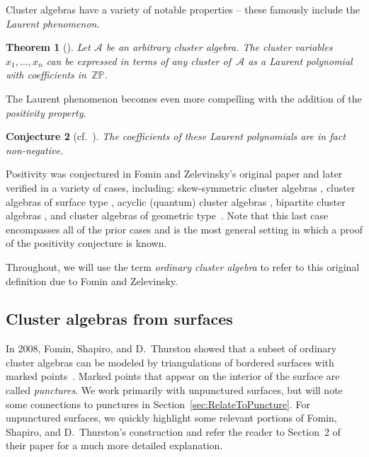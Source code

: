 \documentclass[pdftex]{sigma}%
\numberwithin{equation}{section}
\newtheorem{Theorem}{Theorem}[section]
\newtheorem{Conjecture}[Theorem]{Conjecture}
 { \theoremstyle{definition}
\newtheorem{Definition}[Theorem]{Definition}
\newtheorem{Example}[Theorem]{Example}
\newtheorem{Remark}[Theorem]{Remark} }
\begin{document}
Cluster algebras have a variety of notable properties -- these famously include the \emph{Laurent phenomenon}.

\begin{Theorem}[{\cite[Theorem 3.1]{Fomin-Zelevinsky-I}}]
Let $\mathcal{A}$ be an arbitrary cluster algebra. The cluster variables $x_1, \dots, x_n$ can be expressed in terms of any cluster of~$\mathcal{A}$ as a Laurent polynomial with coefficients in~$\mathbb{ZP}$.
\end{Theorem}

The Laurent phenomenon becomes even more compelling with the addition of the \emph{positivity property}.

\begin{Conjecture}[{cf.\ \cite[Section 3]{Fomin-Zelevinsky-I}}]
The coefficients of these Laurent polynomials are in fact \emph{non-negative}.
\end{Conjecture}

Positivity was conjectured in Fomin and Zelevinsky's original paper \cite{Fomin-Zelevinsky-I} and later verified in a variety of cases, including: skew-symmetric cluster algebras \cite{Lee-Schiffler}, cluster algebras of surface type \cite{MSW, Schiffler, Schiffler-Thomas}, acyclic (quantum) cluster algebras \cite{Caldero-Reineke, Efimov,Kimura-Qin, Qin}, bipartite cluster algebras \cite{Nakajima}, and cluster algebras of geometric type~\cite{GHKK}. Note that this last case encompasses all of the prior cases and is the most general setting in which a proof of the positivity conjecture is known.

Throughout, we will use the term \emph{ordinary cluster algebra} to refer to this original definition due to Fomin and Zelevinsky.

\subsection{Cluster algebras from surfaces}

In 2008, Fomin, Shapiro, and D.~Thurston showed that a subset of ordinary cluster algebras can be modeled by triangulations of bordered surfaces with marked points~\cite{FST-triangulatedSurfaces}. Marked points that appear on the interior of the surface are called \emph{punctures}. We work primarily with unpunctured surfaces, but will note some connections to punctures in Section~\ref{sec:RelateToPuncture}. For unpunctured surfaces, we quickly highlight some relevant portions of Fomin, Shapiro, and D.~Thurston's construction and refer the reader to Section~2 of their paper for a much more detailed explanation.
\end{document}
